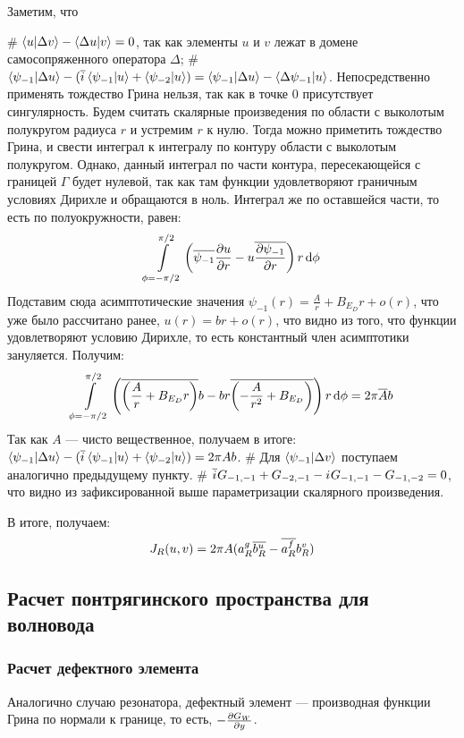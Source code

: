 Заметим, что
\begin{elist}
# $\ip{u}{\Delta v} - \ip{\Delta u}{v} = 0$, так как элементы $u$ и $v$ лежат в домене самосопряженного оператора $\Delta$;
# $\ip{\psi_{-1}}{\Delta u} - (\cconj{\iu} \ip{\psi_{-1}}{u} + \ip{\psi_{-2}}{u}) = \ip{\psi_{-1}}{\Delta u} - \ip{\Delta \psi_{-1}}{u}$. Непосредственно применять тождество Грина нельзя, так как в точке $0$ присутствует сингулярность. Будем считать скалярные произведения по области с выколотым полукругом радиуса $r$ и устремим $r$ к нулю. Тогда можно приметить тождество Грина, и свести интеграл к интегралу по контуру области с выколотым полукругом. Однако, данный интеграл по части контура, пересекающейся с границей $\Gamma$ будет нулевой, так как там функции удовлетворяют граничным условиях Дирихле и обращаются в ноль. Интеграл же по оставшейся части, то есть по полуокружности, равен:
\[
\int\limits_{\phi = -\pi / 2}^{\pi / 2} \left( \overline{\psi_{-1}} \pdv{u}{r} - u \overline{\pdv{\psi_{-1}}{r}} \right) r \dd{\phi}
\]
Подставим сюда асимптотические значения $\psi_{-1}(r) = \frac{A}{r} + B_{E_D} r + o(r)$, что уже было рассчитано ранее, $u(r) = b r + o(r)$, что видно из того, что функции удовлетворяют условию Дирихле, то есть константный член асимптотики зануляется. Получим:
\[
\int\limits_{\phi = -\pi / 2}^{\pi / 2} \left(  \overline{\left( \frac{A}{r} + B_{E_D} r \right)} b - b r \overline{\left( -\frac{A}{r^2} + B_{E_D} \right)} \right) r \dd{\phi} = 2 \pi \overline{A} b
\]
Так как $A$ — чисто вещественное, получаем в итоге: $\ip{\psi_{-1}}{\Delta u} - (\cconj{\iu} \ip{\psi_{-1}}{u} + \ip{\psi_{-2}}{u}) = 2 \pi A b$.
# Для $\ip{\psi_{-1}}{\Delta v}$ поступаем аналогично предыдущему пункту.
# $\overline{{i\mkern1mu}} G_{-1, -1} + G_{-2, -1} - {i\mkern1mu} G_{-1, -1} - G_{-1, -2} = 0$, что видно из зафиксированной выше параметризации скалярного произведения.
\end{elist}
В итоге, получаем:
\begin{align*}
J_R(u, v) = 2 \pi A (a_R^g \overline{b_R^u} - \overline{a_R^f} b_R^v)
\end{align*}

\subsection{Расчет понтрягинского пространства для волновода}
\subsubsection{Расчет дефектного элемента}
Аналогично случаю резонатора, дефектный элемент — производная функции Грина по нормали к границе, то есть, $-\pdv{G_W}{y}$.

